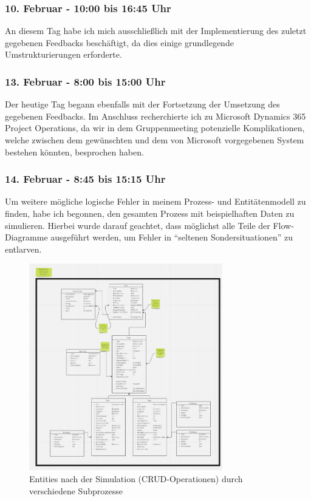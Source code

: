 \subsubsection*{10. Februar - 10:00 bis 16:45 Uhr}
An diesem Tag habe ich mich ausschließlich mit der Implementierung des zuletzt gegebenen Feedbacks beschäftigt, da dies einige grundlegende Umstrukturierungen erforderte.

\subsubsection*{13. Februar - 8:00 bis 15:00 Uhr}
Der heutige Tag begann ebenfalls mit der Fortsetzung der Umsetzung des gegebenen Feedbacks. Im Anschluss recherchierte ich zu Microsoft Dynamics 365 Project Operations, da wir in dem Gruppenmeeting potenzielle Komplikationen, welche zwischen dem gewünschten und dem von Microsoft vorgegebenen System bestehen könnten, besprochen haben.

\subsubsection*{14. Februar - 8:45 bis 15:15 Uhr}
Um weitere mögliche logische Fehler in meinem Prozess- und Entitätenmodell zu finden, habe ich begonnen, den gesamten Prozess mit beispielhaften Daten zu simulieren. Hierbei wurde darauf geachtet, dass möglichst alle Teile der Flow-Diagramme ausgeführt werden, um Fehler in \enquote{seltenen Sondersituationen} zu entlarven.

\begin{figure}[h]
    \centering
    \includegraphics[width=0.75\textwidth]{img/miro_simulation.png}
    \caption{Entities nach der Simulation (CRUD-Operationen) durch verschiedene Subprozesse}
\end{figure}

